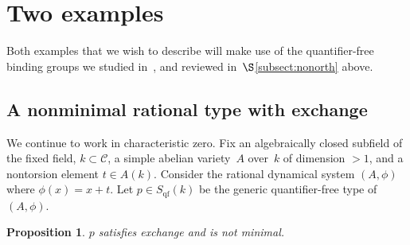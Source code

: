 \documentclass[\DocOpts]{amsart}
\newtheorem{proposition}[theorem]{Proposition}
\theoremstyle{definition}
\def\qf{\operatorname{qf}}
\def\C{\mathcal{C}}
\newcommand{\<}{\langle}
\renewcommand{\>}{\rangle}
\begin{document}
\bigskip
\section{Two examples}
\label{sec:example}

\noindent
Both examples that we wish to describe will make use of the quantifier-free binding groups we studied in~\cite{qfint}, and reviewed in~$\S$\ref{subsect:nonorth} above.


\medskip
\subsection{A nonminimal rational type with exchange}
\label{xexample}

\noindent
We continue to work in characteristic zero.
Fix an algebraically closed subfield of the fixed field, $k\subset\C$, a simple abelian variety~$A$ over~$k$ of dimension $>1$, and a nontorsion element $t\in A(k)$.
Consider the rational dynamical system $(A,\phi)$ where $\phi(x)=x+t$.
Let $p\in S_{\qf}(k)$ be the generic quantifier-free type of $(A,\phi)$.

\begin{proposition}
$p$ satisfies exchange and is not minimal.
\end{proposition}
\end{document}
